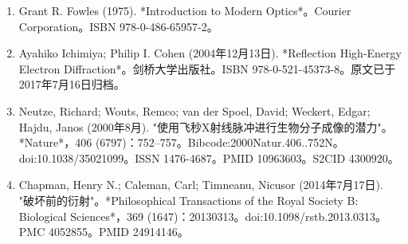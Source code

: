 \begin{enumerate}
\item Grant R. Fowles (1975). *Introduction to Modern Optics*。Courier Corporation。ISBN 978-0-486-65957-2。
\item Ayahiko Ichimiya; Philip I. Cohen (2004年12月13日). *Reflection High-Energy Electron Diffraction*。剑桥大学出版社。ISBN 978-0-521-45373-8。原文已于2017年7月16日归档。
\item Neutze, Richard; Wouts, Remco; van der Spoel, David; Weckert, Edgar; Hajdu, Janos (2000年8月). "使用飞秒X射线脉冲进行生物分子成像的潜力"。*Nature*，406 (6797)：752–757。Bibcode:2000Natur.406..752N。doi:10.1038/35021099。ISSN 1476-4687。PMID 10963603。S2CID 4300920。
\item Chapman, Henry N.; Caleman, Carl; Timneanu, Nicusor (2014年7月17日). "破坏前的衍射"。*Philosophical Transactions of the Royal Society B: Biological Sciences*，369 (1647)：20130313。doi:10.1098/rstb.2013.0313。PMC 4052855。PMID 24914146。
\end{enumerate}
  
